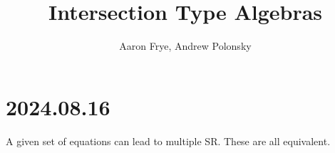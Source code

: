 \documentclass{scrartcl}
\title{Intersection Type Algebras}
\author{Aaron Frye, Andrew Polonsky}
\begin{document}
\section{2024.08.16}

A given set of equations can lead to multiple SR.  These are all equivalent.
\end{document}
